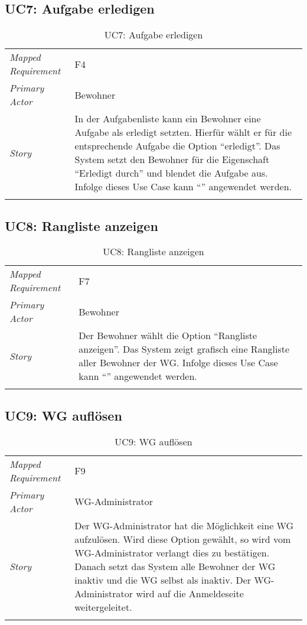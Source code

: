 \subsection{UC7: Aufgabe erledigen}\label{subsec:uc7}
\begin{table}[H]
	\tablestyle
	\tablealtcolored
	\begin{tabularx}{\textwidth}{lX}
		\tablebody
			\textit{Mapped Requirement} &
			F4
			\tabularnewline
			\textit{Primary Actor} &
			Bewohner
			\tabularnewline
			\textit{Story} &
			In der Aufgabenliste kann ein Bewohner eine Aufgabe als erledigt setzten. Hierfür wählt er für die entsprechende Aufgabe die Option ``erledigt''. Das System setzt den Bewohner für die Eigenschaft ``Erledigt durch'' und blendet die Aufgabe aus.
			\newline Infolge dieses Use Case kann ``\nameref{subsec:uc11}'' angewendet werden.
			\tabularnewline
		\tableend
	\end{tabularx}
	\caption{UC7: Aufgabe erledigen}
\end{table}


\subsection{UC8: Rangliste anzeigen}\label{subsec:uc8}
\begin{table}[H]
	\tablestyle
	\tablealtcolored
	\begin{tabularx}{\textwidth}{lX}
		\tablebody
			\textit{Mapped Requirement} &
			F7
			\tabularnewline
			\textit{Primary Actor} &
			Bewohner
			\tabularnewline
			\textit{Story} &
			Der Bewohner wählt die Option ``Rangliste anzeigen''. Das System zeigt grafisch eine Rangliste aller Bewohner der WG.
			\newline Infolge dieses Use Case kann ``\nameref{subsec:uc11}'' angewendet werden.
			\tabularnewline
		\tableend
	\end{tabularx}
	\caption{UC8: Rangliste anzeigen}
\end{table}


\subsection{UC9: WG auflösen}\label{subsec:uc9}
\begin{table}[H]
	\tablestyle
	\tablealtcolored
	\begin{tabularx}{\textwidth}{lX}
		\tablebody
			\textit{Mapped Requirement} &
			F9
			\tabularnewline
			\textit{Primary Actor} &
			WG-Administrator
			\tabularnewline
			\textit{Story} &
			Der WG-Administrator hat die Möglichkeit eine WG aufzulösen. Wird diese Option gewählt, so wird vom WG-Administrator verlangt dies zu bestätigen. Danach setzt das System alle Bewohner der WG inaktiv und die WG selbst als inaktiv. Der WG-Administrator wird auf die Anmeldeseite weitergeleitet.
			\tabularnewline
		\tableend
	\end{tabularx}
	\caption{UC9: WG auflösen}
\end{table}


